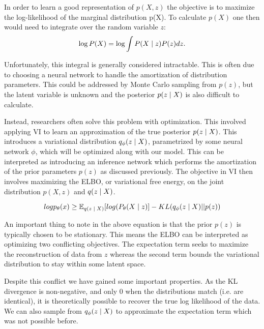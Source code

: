 In order to learn a good representation of $p(X,z)$ the objective is to maximize the log-likelihood of the marginal distribution p(X). To calculate $p(X)$ one then would need to integrate over the random variable $z$:
\begin{equation}
\log P(X) = \log \int P(X \; | \;{z}) P(z) dz.
\end{equation}

Unfortunately, this integral is generally considered intractable. This is often due to choosing a neural network to handle the amortization of distribution parameters. This could be addressed by Monte Carlo sampling from $p(z)$, but the latent variable is unknown and the posterior $p(z \; | \;{X})$ is also difficult to calculate. 

Instead, researchers often solve this problem with optimization. This involved applying \ac{VI} to learn an approximation of the true posterior $p(z \; | \;{X})$. This introduces a variational distribution $q_{\phi}(z \; | \;{X})$, parametrized by some neural network $\phi$, which will be optimized along with our model. This can be interpreted as introducing an inference network which performs the amortization of the prior parameters $p(z)$ as discussed previously. The objective in \ac{VI} then involves maximizing the \ac{ELBO}, or variational free energy, on the joint distribution $p(X, z)$ and $q(z \; | \;{X})$. 

\begin{equation}
	log p_{\theta}(x) \geq \operatorname{\mathbb{E}}_{q(z \; | \;{X})} [ log(P_{\theta}(X \; | \;{z}) ]  - KL(q_{\phi}(z \; | \;{X}) || p(z))
\end{equation}

An important thing to note in the above equation is that the prior $p(z)$ is typically chosen to be stationary. This means the \ac{ELBO} can be interpreted as optimizing two conflicting objectives. The expectation term seeks to maximize the reconstruction of data from $z$ whereas the second term bounds the variational distribution to stay within some latent space.

Despite this conflict we have gained some important properties. As the KL divergence is non-negative, and only 0 when the distributions match (i.e. are identical), it is theoretically possible to recover the true log likelihood of the data. We can also sample from $q_{\phi}(z \; | \;{X})$ to approximate the expectation term which was not possible before.

